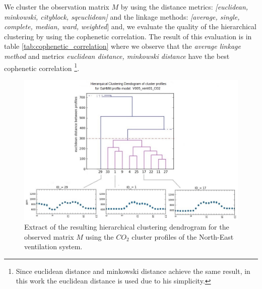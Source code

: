 We cluster the observation matrix $M$ by using the distance metrics: \textit{[euclidean, minkowski, cityblock, sqeuclidean]} and the linkage methods: \textit{[average, single, complete, median, ward, weighted}] \citep{saraccli2013comparison} and, we evaluate the quality of the hierarchical clustering by using the cophenetic correlation. The result of this evaluation is in table \ref{tab:cophenetic_correlation} where we observe that the \textit{average linkage method} and metrics \textit{euclidean distance, minkowski distance} have the best cophenetic correlation \footnote{Since euclidean distance and minkowski distance achieve the same result, in this work the euclidean distance is used due to his simplicity.}. \\ 


 
\begin{figure}[h!]
  \vspace{0.5em} %
  \includegraphics[scale=0.65]{Figures/dendrogram_CO2_NE.jpg}
  \caption{ Extract of the resulting hierarchical clustering dendrogram for the observed matrix $M$ using the $CO_2$ cluster profiles of the North-East ventilation system.}
  \label{fig:dendrogram_CO2_NE}
\end{figure} 

